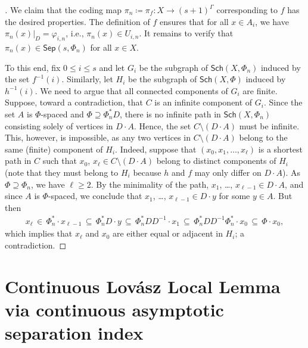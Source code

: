 \documentclass[11pt,reqno,psamsfonts]{amsart}
\theoremstyle{bfnote}
\theoremstyle{definition}
\theoremstyle{remark}
\newcommand{\0}{\varnothing}
\newcommand{\set}[1]{\{#1\}}
\renewcommand{\phi}{\varphi}
\renewcommand{\leq}{\leqslant}
\renewcommand{\geq}{\geqslant}
\newcommand{\defeq}{\coloneqq}
\newcommand{\bemph}[1]{{\normalfont#1}}
\newcommand{\ep}[1]{\bemph{(}#1\bemph{)}}
\newcommand{\G}{\Gamma}
\newcommand{\rest}[2]{{{#1}\vert_{#2}}}
\newcommand{\Sch}{\mathsf{Sch}}
\newcommand{\iden}{\mathbf{1}}
\newcommand{\Sep}{\mathsf{Sep}}
\numberwithin{equation}{section}
\newenvironment{scproof}[1][]{\begin{proof}[\textsc{\upshape{Proof}}#1]}{\end{proof}}
\begin{document}
\begin{scproof}
            We claim that the coding map $\pi_n \defeq \pi_f \colon X \to (s+1)^\G$ corresponding to $f$ has the desired properties. The definition of $f$ ensures that for all $x \in A_i$, we have $\rest{\pi_n(x)}{D} = \phi_{i,n}$, i.e., $\pi_n(x) \in U_{i,n}$. It remains to verify that $\pi_n(x) \in \Sep(s, \Phi_n)$ for all $x \in X$. %

            To this end, fix $0 \leq i \leq s$ and let $G_i$ be the subgraph of $\Sch(X, \Phi_n)$ induced by the set $f^{-1}(i)$. Similarly, let $H_i$ be the subgraph of $\Sch(X,\Phi)$ induced by $h^{-1}(i)$. %
            We need to argue that all connected components of $G_i$ are finite. 
            Suppose, toward a contradiction, that $C$ is an infinite component of $G_i$. Since the set $A$ is $\Phi$-spaced and $\Phi \supseteq \Phi_n^* D$, there is no infinite path in $\Sch(X,\Phi_n)$ consisting solely of vertices in $D \cdot A$. Hence, the set $C \setminus (D \cdot A)$ must be infinite. This, however, is impossible, as any two vertices in $C \setminus (D \cdot A)$ belong to the same \ep{finite} component of $H_i$. Indeed, suppose %
            that $(x_0,x_1,\ldots,x_\ell)$ is a shortest path in $C$ such that $x_0$, $x_\ell \in C \setminus (D \cdot A)$ belong to distinct components of $H_i$ (note that they must belong to $H_i$ because $h$ and $f$ may only differ on $D \cdot A$). As $\Phi \supseteq \Phi_n$, we have $\ell \geq 2$. By the minimality of the path, $x_1$, \ldots, $x_{\ell - 1} \in D \cdot A$, and since $A$ is $\Phi$-spaced, we conclude that $x_1$, \ldots, $x_{\ell - 1} \in D \cdot y$ for some $y \in A$. %
            But then
            \begin{align*}
                x_{\ell} \,\in\, \Phi_n^* \cdot x_{\ell - 1} \,\subseteq\, \Phi_n^*D \cdot y \,\subseteq\, \Phi_n^*DD^{-1} \cdot x_1 \,\subseteq\,  \Phi_n^*DD^{-1}\Phi_n^* \cdot x_0 \,\subseteq\, \Phi \cdot x_0,
            \end{align*}
            which implies that $x_\ell$ and $x_0$ are either equal or adjacent in $H_i$; a contradiction.
    \end{scproof}
    

    \section{Continuous Lov\'asz Local Lemma via continuous asymptotic separation index}\label{sec:CLLL}
\end{document}
